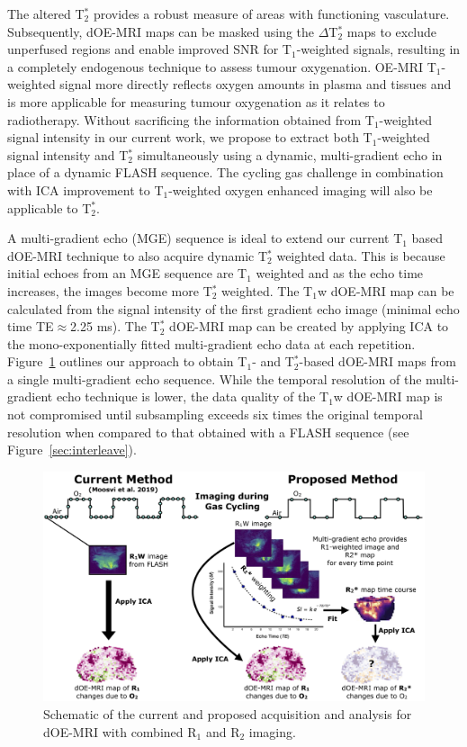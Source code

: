 The altered T$_2^*$ provides a robust measure of areas with functioning vasculature. 
Subsequently, \acs{dOE-MRI} maps can be masked using the $\Delta$T$_2^*$ maps to exclude unperfused regions and enable improved \acs{SNR} for T$_1$-weighted signals, resulting in a completely endogenous technique to assess tumour oxygenation. 
OE-MRI T$_1$-weighted signal more directly reflects oxygen amounts in plasma and tissues and is more applicable for measuring tumour oxygenation as it relates to radiotherapy.
Without sacrificing the information obtained from T$_1$-weighted signal intensity in our current work, we propose to extract both T$_1$-weighted signal intensity and T$_2^*$ simultaneously using a dynamic, multi-gradient echo in place of a dynamic FLASH sequence. 
The cycling gas challenge in combination with \acs{ICA} improvement to T$_1$-weighted oxygen enhanced imaging will also be applicable to T$_2^*$.

A multi-gradient echo (\acs{MGE}) sequence is ideal to extend our current T$_1$ based dOE-MRI technique to also acquire dynamic T$_2^*$ weighted data.
This is because initial echoes from an \acs{MGE} sequence are T$_1$ weighted and as the echo time increases, the images become more T$_2^*$ weighted. 
The T$_1$w \acs{dOE-MRI} map can be calculated from the signal intensity of the first gradient echo image (minimal echo time TE$\approx$2.25 ms). 
The T$_2^*$ \acs{dOE-MRI} map can be created by applying \acs{ICA} to the mono-exponentially fitted multi-gradient echo data at each repetition. 
Figure~\ref{MGE_schematic} outlines our approach to obtain T$_1$- and T$_2^*$-based \acs{dOE-MRI} maps from a single multi-gradient echo sequence. 
While the temporal resolution of the multi-gradient echo technique is lower, the data quality of the T$_1$w \acs{dOE-MRI} map is not compromised until subsampling exceeds six times the original temporal resolution when compared to that obtained with a \acs{FLASH} sequence (see Figure~\ref{sec:interleave}).

\begin{figure}[htbp]
   \centering
   \includegraphics[width=\textwidth]{futurework/futurework-images/grantfig4_MGE_schematic.png} %
   \caption{Schematic of the current and proposed acquisition and analysis for \acs{dOE-MRI} with combined R$_1$ and R$_2$ imaging.
   \label{MGE_schematic}}
\end{figure}

